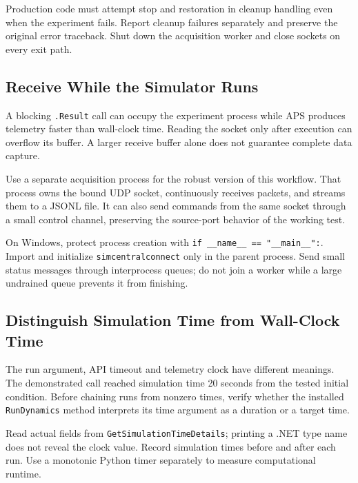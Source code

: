 \documentclass[11pt, letterpaper]{article}
\begin{document}
Production code must attempt stop and restoration in cleanup handling even when the experiment fails. Report cleanup failures separately and preserve the original error traceback. Shut down the acquisition worker and close sockets on every exit path.

\subsection{Receive While the Simulator Runs}
A blocking \texttt{.Result} call can occupy the experiment process while APS produces telemetry faster than wall-clock time. Reading the socket only after execution can overflow its buffer. A larger receive buffer alone does not guarantee complete data capture.

Use a separate acquisition process for the robust version of this workflow. That process owns the bound UDP socket, continuously receives packets, and streams them to a JSONL file. It can also send commands from the same socket through a small control channel, preserving the source-port behavior of the working test.

On Windows, protect process creation with \texttt{if \_\_name\_\_ == "\_\_main\_\_":}. Import and initialize \texttt{simcentralconnect} only in the parent process. Send small status messages through interprocess queues; do not join a worker while a large undrained queue prevents it from finishing.

\subsection{Distinguish Simulation Time from Wall-Clock Time}
The run argument, API timeout and telemetry clock have different meanings. The demonstrated call reached simulation time 20 seconds from the tested initial condition. Before chaining runs from nonzero times, verify whether the installed \texttt{RunDynamics} method interprets its time argument as a duration or a target time.

Read actual fields from \texttt{GetSimulationTimeDetails}; printing a .NET type name does not reveal the clock value. Record simulation times before and after each run. Use a monotonic Python timer separately to measure computational runtime.
\end{document}
